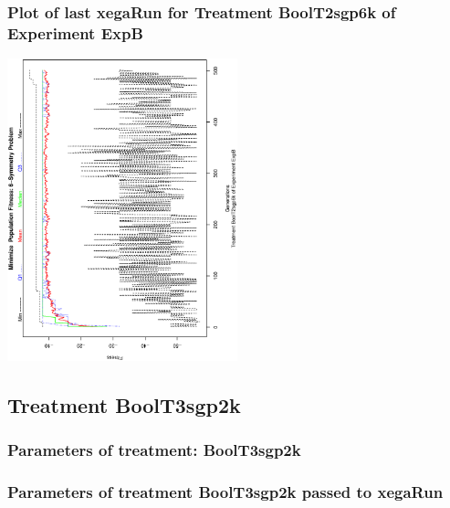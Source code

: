 \documentclass[18pt,c]{beamer}
\makeatletter
\def\beamer@writeslidentry@miniframesoff{%
  \expandafter\beamer@ifempty\expandafter{\beamer@framestartpage}{}%
  {%
   \clearpage\beamer@notesactions%
  }
}
\newcommand*{\miniframesoff}{\let\beamer@writeslidentry=\beamer@writeslidentry@miniframesoff}
\makeatother
\begin{document}
 \begin{frame}
 \frametitle{ Plot of last xegaRun for Treatment BoolT2sgp6k of Experiment ExpB }
 \begin{center}
\includegraphics[width=0.5\textwidth, angle=-90]
{ExpBPlotPopStatsFigure014.eps}
 \end{center}
 \label{report/ExpBPlotPopStatsFigure014.eps}  
 \end{frame}

\miniframesoff
\subsection{Treatment BoolT3sgp2k}

 \begin{frame}
 \fontsize{8pt}{9pt}\selectfont
 \frametitle{  Parameters of treatment: BoolT3sgp2k 
 }

 \label{ExpBtParmTable060.tex}  
 \end{frame}


 \begin{frame}
 \fontsize{8pt}{9pt}\selectfont
 \frametitle{  Parameters of treatment BoolT3sgp2k passed to xegaRun
 }

 \label{ExpBtParmTable061.tex}  
 \end{frame}
\end{document}
